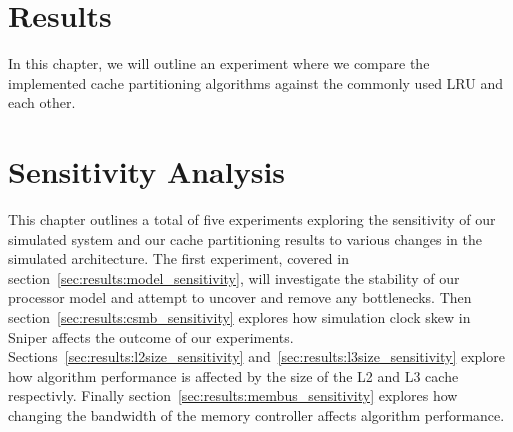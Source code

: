 \chapter{Results}
\label{cpt:results}
In this chapter, we will outline an experiment where we compare the implemented cache partitioning algorithms against the commonly used LRU and each other.




\chapter{Sensitivity Analysis}
\label{cpt:sresults}
This chapter outlines a total of five experiments exploring the sensitivity of our simulated system and our cache partitioning results to various changes in the simulated architecture.
The first experiment, covered in section~\ref{sec:results:model_sensitivity}, will investigate the stability of our processor model and attempt to uncover and remove any bottlenecks.
Then section~\ref{sec:results:csmb_sensitivity} explores how simulation clock skew in Sniper affects the outcome of our experiments.
Sections~\ref{sec:results:l2size_sensitivity} and~\ref{sec:results:l3size_sensitivity} explore how algorithm performance is affected by the size of the L2 and L3 cache respectivly.
Finally section~\ref{sec:results:membus_sensitivity} explores how changing the bandwidth of the memory controller affects algorithm performance.










